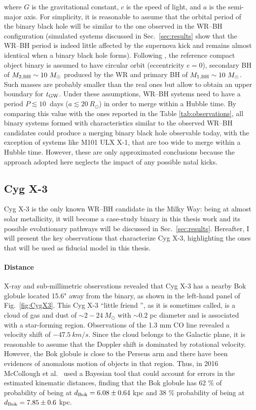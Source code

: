 \documentclass[a4paper,titlepage]{book}     	%
\newcommand{\sun}{\ensuremath{_\odot}}
\newcommand{\msun}{\ensuremath{M\sun}}
\newcommand{\rsun}{R_{\odot}}
\begin{document}
where $G$ is the gravitational constant, $c$ is the speed of light, and $a$ is the semi-major axis. For simplicity, it is reasonable to assume that the orbital period of the binary black hole will be similar to the one observed in the WR--BH configuration (simulated systems discussed in Sec.\ \ref{sec:results} show that the WR--BH period is indeed little affected by the supernova kick and remains almost identical when a binary black hole forms). Following \cite{observations}, the reference compact object binary is assumed to have circular orbit (eccentricity $e=0$), secondary BH of $M_{2,\rm BH} \sim 10~\msun$ produced by the WR and primary BH of $M_{1,\rm BH} \sim 10~\msun$. Such masses are probably smaller than the real ones but allow to obtain an upper boundary for $t_\textup{GW}$. Under these assumptions, WR--BH systems need to have a period $P \lesssim 10~$ days ($a \lesssim 20~\rsun$) in order to merge within a Hubble time. By comparing this value with the ones reported in the Table \ref{tab:observations}, all binary systems formed with characteristics similar to the observed WR--BH candidates could produce a merging binary black hole observable today, with the exception of systems like M101 ULX X-1, that are too wide to merge within a Hubble time. However, these are only approximated conclusions because the approach adopted here neglects the impact of any possible natal kicks.


\subsection{Cyg X-3}\label{subsec:cygx3observations}
Cyg X-3 is the only known WR--BH candidate in the Milky Way: being at almost solar metallicity, it will become a case-study binary in this thesis work and its possible evolutionary pathways will be discussed in Sec.\ \ref{sec:results}. Hereafter, I will present the key observations that characterize Cyg X-3, highlighting the ones that will be used as fiducial model in this thesis.

\paragraph{Distance}
X-ray and sub-millimetric observations revealed that Cyg X-3 has a nearby Bok globule located 15.6" away from the binary, as shown in the left-hand panel of Fig.\ \ref{fig:CygX3}. This Cyg X-3 ``little friend '', as it is sometimes called, is a cloud of gas and dust of $\sim 2-24~\msun$ with $\sim 0.2$ pc diameter and is associated with a star-forming region. Observations of the 1.3 mm CO line revealed a velocity shift of $\SI{-47.5}{km/s}$. Since the cloud belongs to the Galactic plane, it is reasonable to assume that the Doppler shift is dominated by rotational velocity. However, the Bok globule is close to the Perseus arm and there have been evidences of anomalous motion of objects in that region. Thus, in 2016 McCollough et al.\ \cite{CygX-3_McCollough2016_Observation} used a Bayesian tool that could account for errors in the estimated kinematic distances, finding that the Bok globule has 62 \% of probability of being at $d_{\rm Bok} = 6.08 \pm 0.64$ kpc and 38 \% probability of being at $d_{\rm Bok} = 7.85 \pm 0.6$ kpc.
\end{document}
